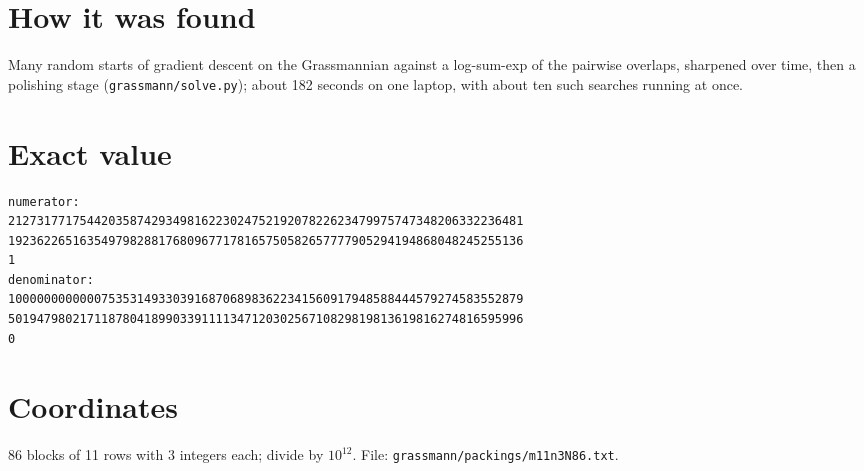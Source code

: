 \documentclass[11pt,a4paper]{article}
\begin{document}
\section{How it was found}
Many random starts of gradient descent on the Grassmannian against a log-sum-exp of the pairwise overlaps, sharpened over time, then a polishing stage (\texttt{grassmann/solve.py}); about 182 seconds on one laptop, with about ten such searches running at once.


\appendix
\section{Exact value}
{\small
\begin{verbatim}
numerator:
212731771754420358742934981622302475219207822623479975747348206332236481
192362265163549798288176809677178165750582657777905294194868048245255136
1
denominator:
100000000000075353149330391687068983622341560917948588444579274583552879
501947980217118780418990339111134712030256710829819813619816274816595996
0
\end{verbatim}}

\section{Coordinates}
86 blocks of 11 rows with 3 integers each; divide by $10^{12}$. File: \texttt{grassmann/packings/m11n3N86.txt}.
{\tiny
\begin{multicols}{3}
\end{multicols}}
\end{document}
